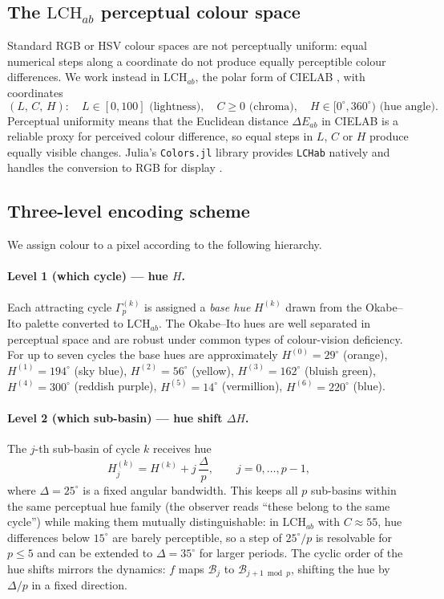 \documentclass[12pt]{article}
\theoremstyle{definition}
\begin{document}
\subsection{The \texorpdfstring{$\mathrm{LCH}_{ab}$}{LCHab} perceptual colour space}

Standard RGB or HSV colour spaces are not perceptually uniform: equal numerical
steps along a coordinate do not produce equally perceptible colour differences.
We work instead in $\mathrm{LCH}_{ab}$, the polar form of CIELAB
\cite{Fairchild2013}, with coordinates
\[
  (L,\,C,\,H): \quad
  L\in[0,100] \text{ (lightness)},\quad
  C\geq 0 \text{ (chroma)},\quad
  H\in[0^\circ,360^\circ) \text{ (hue angle)}.
\]
Perceptual uniformity means that the Euclidean distance $\Delta E_{ab}$ in
CIELAB is a reliable proxy for perceived colour difference, so equal steps in
$L$, $C$ or $H$ produce equally visible changes.
Julia's \texttt{Colors.jl} library provides \texttt{LCHab} natively and handles
the conversion to RGB for display \cite{ColorsJl}.

\subsection{Three-level encoding scheme}

We assign colour to a pixel according to the following hierarchy.

\paragraph{Level 1 (which cycle) --- hue $H$.}
Each attracting cycle $\Gamma_p^{(k)}$ is assigned a \emph{base hue}
$H^{(k)}$ drawn from the Okabe--Ito palette \cite{OkabIto2008} converted to
$\mathrm{LCH}_{ab}$.  The Okabe--Ito hues are well separated in perceptual
space and are robust under common types of colour-vision deficiency.  For up
to seven cycles the base hues are approximately
$H^{(0)}=29^\circ$ (orange), $H^{(1)}=194^\circ$ (sky blue),
$H^{(2)}=56^\circ$ (yellow), $H^{(3)}=162^\circ$ (bluish green),
$H^{(4)}=300^\circ$ (reddish purple), $H^{(5)}=14^\circ$ (vermillion),
$H^{(6)}=220^\circ$ (blue).

\paragraph{Level 2 (which sub-basin) --- hue shift $\Delta H$.}
The $j$-th sub-basin of cycle $k$ receives hue
\[
  H^{(k)}_j = H^{(k)} + j\,\frac{\Delta}{p},
  \qquad j=0,\ldots,p-1,
\]
where $\Delta=25^\circ$ is a fixed angular bandwidth.  This keeps all
$p$ sub-basins within the same perceptual hue family (the observer reads
``these belong to the same cycle'') while making them mutually distinguishable:
in $\mathrm{LCH}_{ab}$ with $C\approx55$, hue differences below $15^\circ$ are
barely perceptible, so a step of $25^\circ/p$ is resolvable for $p\leq5$ and
can be extended to $\Delta=35^\circ$ for larger periods.
The cyclic order of the hue shifts mirrors the dynamics: $f$ maps
$\mathcal{B}_j$ to $\mathcal{B}_{j+1\bmod p}$, shifting the hue by
$\Delta/p$ in a fixed direction.
\end{document}
